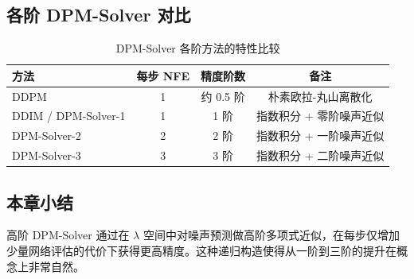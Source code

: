 \subsection{各阶 DPM-Solver 对比}

\begin{table}[H]
\centering
\begin{tabular}{lccc}
\toprule
\textbf{方法} & \textbf{每步 NFE} & \textbf{精度阶数} & \textbf{备注} \\
\midrule
DDPM & 1 & 约 0.5 阶 & 朴素欧拉-丸山离散化 \\
DDIM / DPM-Solver-1 & 1 & 1 阶 & 指数积分 + 零阶噪声近似 \\
DPM-Solver-2 & 2 & 2 阶 & 指数积分 + 一阶噪声近似 \\
DPM-Solver-3 & 3 & 3 阶 & 指数积分 + 二阶噪声近似 \\
\bottomrule
\end{tabular}
\caption{DPM-Solver 各阶方法的特性比较}
\end{table}

\subsection{本章小结}

高阶 DPM-Solver 通过在 $\lambda$ 空间中对噪声预测做高阶多项式近似，在每步仅增加少量网络评估的代价下获得更高精度。这种递归构造使得从一阶到三阶的提升在概念上非常自然。



